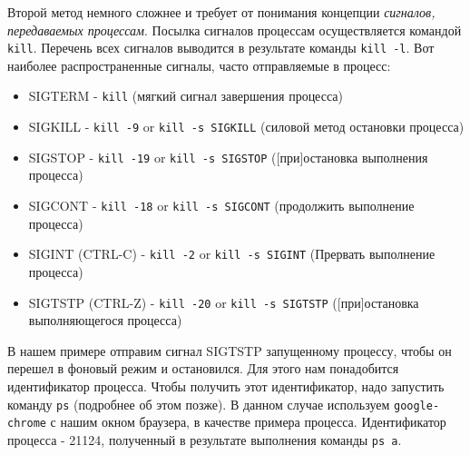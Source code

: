 \documentclass{report}
\begin{document}
Второй метод немного сложнее и требует от понимания концепции
\emph{сигналов, передаваемых процессам}. Посылка сигналов процессам
осуществляется командой \texttt{kill}. Перечень всех сигналов выводится
в результате команды \texttt{kill\ -l}. Вот наиболее распространенные
сигналы, часто отправляемые в процесс:

\begin{itemize}
\tightlist
\item
  SIGTERM - \texttt{kill} (мягкий сигнал завершения процесса)
\item
  SIGKILL - \texttt{kill\ -9} or \texttt{kill\ -s\ SIGKILL} (силовой
  метод остановки процесса)
\item
  SIGSTOP - \texttt{kill\ -19} or \texttt{kill\ -s\ SIGSTOP}
  ({[}при{]}остановка выполнения процесса)
\item
  SIGCONT - \texttt{kill\ -18} or \texttt{kill\ -s\ SIGCONT} (продолжить
  выполнение процесса)
\item
  SIGINT (CTRL-C) - \texttt{kill\ -2} or \texttt{kill\ -s\ SIGINT}
  (Прервать выполнение процесса)
\item
  SIGTSTP (CTRL-Z) - \texttt{kill\ -20} or \texttt{kill\ -s\ SIGTSTP}
  ({[}при{]}остановка выполняющегося процесса)
\end{itemize}

В нашем примере отправим сигнал SIGTSTP запущенному процессу, чтобы он
перешел в фоновый режим и остановился. Для этого нам понадобится
идентификатор процесса. Чтобы получить этот идентификатор, надо
запустить команду \texttt{ps} (подробнее об этом позже). В данном случае
используем \texttt{google-chrome} с нашим окном браузера, в качестве
примера процесса. Идентификатор процесса - 21124, полученный в
результате выполнения команды \texttt{ps\ a}.
\end{document}
